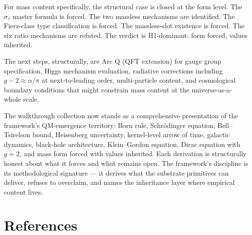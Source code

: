 \documentclass[11pt,a4paper]{article}
\begin{document}
For mass content specifically, the structural case is closed at the form level. The $\sigma_\tau$ master formula is forced. The two massless mechanisms are identified. The Fierz-class type classification is forced. The massless-slot existence is forced. The six ratio mechanisms are refuted. The verdict is H1-dominant: form forced, values inherited.

The next steps, structurally, are Arc Q (QFT extension) for gauge group specification, Higgs mechanism evaluation, radiative corrections including $g - 2 \approx \alpha/\pi$ at next-to-leading order, multi-particle content, and cosmological boundary conditions that might constrain mass content at the universe-as-a-whole scale.

The walkthrough collection now stands as a comprehensive presentation of the framework's QM-emergence territory: Born rule, Schr\"odinger equation, Bell--Tsirelson bound, Heisenberg uncertainty, kernel-level arrow of time, galactic dynamics, black-hole architecture, Klein--Gordon equation, Dirac equation with $g = 2$, and mass form forced with values inherited. Each derivation is structurally honest about what it forces and what remains open. The framework's discipline is its methodological signature --- it derives what the substrate primitives can deliver, refuses to overclaim, and names the inheritance layer where empirical content lives.

\section*{References}
\end{document}
